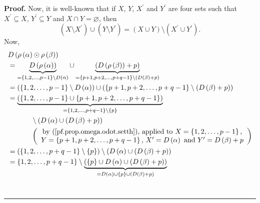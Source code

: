 \documentclass[numbers=enddot,12pt,final,onecolumn,notitlepage,abstracton]{scrartcl}%
\theoremstyle{definition}
\newenvironment{proof}[1][Proof]{\noindent\textbf{#1.} }{\ \rule{0.5em}{0.5em}}
\newenvironment{verlong}{}{}
\begin{document}
\begin{verlong}
\begin{proof}
Now, it is well-known that if $X$, $Y$, $X^{\prime}$ and $Y^{\prime}$ are four
sets such that $X^{\prime}\subseteq X$, $Y^{\prime}\subseteq Y$ and $X\cap
Y=\varnothing$, then
\begin{equation}
\left(  X\setminus X^{\prime}\right)  \cup\left(  Y\setminus Y^{\prime
}\right)  =\left(  X\cup Y\right)  \setminus\left(  X^{\prime}\cup Y^{\prime
}\right)  . \label{pf.prop.omega.odot.setth}%
\end{equation}
Now,%
\begin{align*}
&  D\left(  \rho\left(  \alpha\right)  \odot\rho\left(  \beta\right)  \right)
\\
&  =\underbrace{D\left(  \rho\left(  \alpha\right)  \right)  }_{=\left\{
1,2,\ldots,p-1\right\}  \setminus D\left(  \alpha\right)  }\cup
\underbrace{\left(  D\left(  \rho\left(  \beta\right)  \right)  +p\right)
}_{=\left\{  p+1,p+2,\ldots,p+q-1\right\}  \setminus\left(  D\left(
\beta\right)  +p\right)  }\\
&  =\left(  \left\{  1,2,\ldots,p-1\right\}  \setminus D\left(  \alpha\right)
\right)  \cup\left(  \left\{  p+1,p+2,\ldots,p+q-1\right\}  \setminus\left(
D\left(  \beta\right)  +p\right)  \right) \\
&  =\underbrace{\left(  \left\{  1,2,\ldots,p-1\right\}  \cup\left\{
p+1,p+2,\ldots,p+q-1\right\}  \right)  }_{=\left\{  1,2,\ldots,p+q-1\right\}
\setminus\left\{  p\right\}  }\\
&  \ \ \ \ \ \ \ \ \ \ \setminus\left(  D\left(  \alpha\right)  \cup\left(
D\left(  \beta\right)  +p\right)  \right) \\
&  \ \ \ \ \ \ \ \ \ \ \left(
\begin{array}
[c]{c}%
\text{by (\ref{pf.prop.omega.odot.setth}), applied to }X=\left\{
1,2,\ldots,p-1\right\}  \text{,}\\
Y=\left\{  p+1,p+2,\ldots,p+q-1\right\}  \text{, }X^{\prime}=D\left(
\alpha\right)  \text{ and }Y^{\prime}=D\left(  \beta\right)  +p
\end{array}
\right) \\
&  =\left(  \left\{  1,2,\ldots,p+q-1\right\}  \setminus\left\{  p\right\}
\right)  \setminus\left(  D\left(  \alpha\right)  \cup\left(  D\left(
\beta\right)  +p\right)  \right) \\
&  =\left\{  1,2,\ldots,p+q-1\right\}  \setminus\underbrace{\left(  \left\{
p\right\}  \cup D\left(  \alpha\right)  \cup\left(  D\left(  \beta\right)
+p\right)  \right)  }_{=D\left(  \alpha\right)  \cup\left\{  p\right\}
\cup\left(  D\left(  \beta\right)  +p\right)  }\\

\end{align*}
\end{proof}
\end{verlong}
\end{document}
